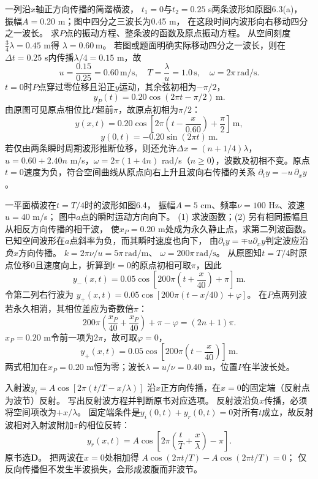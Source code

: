 \problemtext 一列沿$x$轴正方向传播的简谐横波，
$t_1=0$与$t_2=0.25$ s两条波形如原图6.3(a)，
振幅$A=0.20$ m；图中四分之三波长为0.45 m，
在这段时间内波形向右移动四分之一波长。
求$P$点的振动方程、整条波的函数及原点振动方程。
\workings
从空间刻度
$\frac34\lambda=0.45$ m得
$\boxed{\lambda=0.60\,\mathrm m}$。
若图或题面明确实际移动四分之一波长，则在$\Delta t=0.25$ s内传播$\lambda/4=0.15$ m，故
\[
\boxed{u=\frac{0.15}{0.25}=0.60\,\mathrm{m/s}},
\quad
\boxed{T=\frac\lambda u=1.0\,\mathrm s},
\quad\omega=2\pi\,\mathrm{rad/s}.
\]
$t=0$时$P$点穿过零位移且沿正$y$运动，其余弦初相为$-\pi/2$，
\[
\boxed{y_P(t)=0.20\cos(2\pi t-\pi/2)\,\mathrm m}.
\]
由原图可见原点相位比$P$超前$\pi$，故原点初相为$\pi/2$：
\[
\boxed{y(x,t)=0.20\cos\left[
2\pi\left(t-\frac{x}{0.60}\right)+\frac\pi2\right]\,\mathrm m},
\]
\[
\boxed{y(0,t)=-0.20\sin(2\pi t)\,\mathrm m}.
\]
\crosscheck 若仅由两条瞬时周期波形推断位移，则还允许$\Delta x=(n+1/4)\lambda$，$u=0.60+2.40n$ m/s，$\omega=2\pi(1+4n)$ rad/s（$n\ge0$），波数及初相不变。原点$t=0$速度为负，符合空间曲线从原点向右上升且波向右传播的关系
$\partial_t y=-u\,\partial_x y$。

\problemtext 一平面横波在$t=T/4$时的波形如图6.4，
振幅$A=5$ cm、频率$\nu=100$ Hz、波速$u=40$ m/s；
图中$a$点的瞬时运动方向向下。
(1) 求波函数；(2) 另有相同振幅且从相反方向传播的相干波，
使$x_P=0.20$ m处成为永久静止点，求第二列波函数。
\workings
已知空间波形在$a$点斜率为负，而其瞬时速度也向下，
由$\partial_t y=\mp u\partial_x y$判定波应沿\emph{负}$x$方向传播。
$k=2\pi\nu/u=5\pi\,\mathrm{rad/m}$、
$\omega=200\pi\,\mathrm{rad/s}$。
从原图知$t=T/4$时原点位移0且速度向上，折算到$t=0$的原点初相可取$\pi$，因此
\[
\boxed{y_-(x,t)=0.05\cos\left[
200\pi\left(t+\frac{x}{40}\right)+\pi\right]\,\mathrm m}.
\]
令第二列右行波为
$y_+(x,t)=0.05\cos[200\pi(t-x/40)+\varphi]$。
在$P$点两列波若永久相消，其相位差应为奇数倍$\pi$：
\[
200\pi\left(\frac{x_P}{40}+\frac{x_P}{40}\right)
+\pi-\varphi=(2n+1)\pi.
\]
$x_P=0.20$ m令前一项为$2\pi$，故可取$\varphi=0$，
\[
\boxed{y_+(x,t)=0.05\cos\left[
200\pi\left(t-\frac{x}{40}\right)\right]\,\mathrm m}.
\]
\crosscheck 两式相加在$x_P=0.20$ m恒为零；波长$\lambda=u/\nu=0.40$ m，位置$P$在半波长处。

\problemtext 入射波$y_i=A\cos[2\pi(t/T-x/\lambda)]$
沿$x$正方向传播，在$x=0$的固定端（反射点为波节）反射。
写出反射波方程并判断原书对应选项。
\workings
反射波沿负$x$传播，必须将空间项改为$+x/\lambda$。
固定端条件是$y_i(0,t)+y_r(0,t)=0$对所有$t$成立，故反射波相对入射波附加$\pi$的相位反转：
\[
\boxed{y_r(x,t)=A\cos\left[
2\pi\left(\frac tT+\frac{x}{\lambda}\right)-\pi\right]}.
\]
原书选\textbf{D}。
\crosscheck 把两波在$x=0$处相加得
$A\cos(2\pi t/T)-A\cos(2\pi t/T)=0$；
仅反向传播但不发生半波损失，会形成波腹而非波节。

